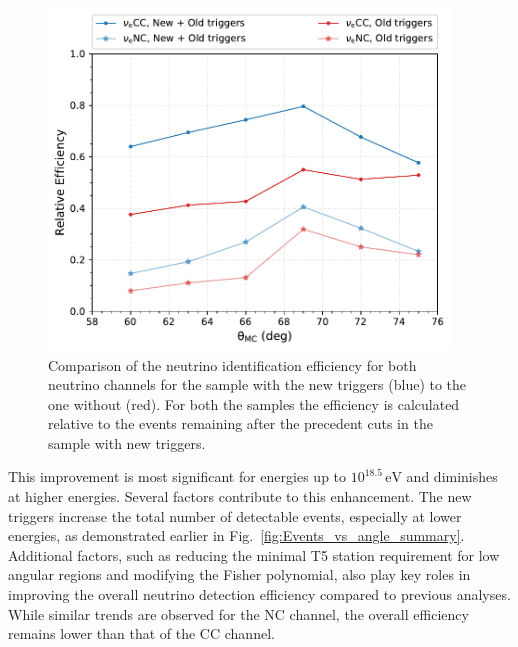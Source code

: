 \begin{figure}[h!]
  \centering
  \includegraphics[width=0.95\textwidth]{thesis_figures/Nu_analysis/Nu_eff/Rel_efficencies_theta_comp_redcut.pdf}
  \caption{Comparison of the neutrino identification efficiency for both neutrino channels for the sample with the new triggers (blue) to the one without (red). For both the samples the efficiency is calculated relative to the events remaining after the precedent cuts in the sample with new triggers.}
  \label{fig:Eff_v_theta_channel_comp}
\end{figure}


 This improvement is most significant for energies up to \(10^{18.5}\,\mathrm{eV}\) and diminishes at higher energies. Several factors contribute to this enhancement. The new triggers increase the total number of detectable events, especially at lower energies, as demonstrated earlier in Fig.~\ref{fig:Events_vs_angle_summary}. Additional factors, such as reducing the minimal T5 station requirement for low angular regions and modifying the Fisher polynomial, also play key roles in improving the overall neutrino detection efficiency compared to previous analyses. While similar trends are observed for the NC channel, the overall efficiency remains lower than that of the CC channel.





